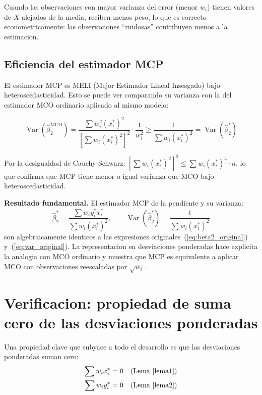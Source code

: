 \documentclass[12pt, letterpaper]{article}
\theoremstyle{remark}
\newcommand{\Var}{\operatorname{Var}}
\newcommand{\ystar}{y_i^*}
\newcommand{\xstar}{x_i^*}
\begin{document}
Cuando las observaciones con mayor varianza del error (menor $w_i$) tienen
valores de $X$ alejados de la media, reciben menos peso, lo que es correcto
econometricamente: las observaciones ``ruidosas'' contribuyen menos a la
estimacion.

\subsection{Eficiencia del estimador MCP}

El estimador MCP es MELI (Mejor Estimador Lineal Insesgado) bajo heteroscedasticidad.
Esto se puede ver comparando su varianza con la del estimador MCO ordinario
aplicado al mismo modelo:

\begin{equation}
  \Var(\hat\beta_2^{\text{MCO}})
    = \frac{\sum w_i^2 (\xstar)^2}{\left[\sum w_i(\xstar)^2\right]^2}
    \cdot \frac{1}{w_i^2}
  \geq \frac{1}{\sum w_i(\xstar)^2}
    = \Var(\hat\beta_2^*)
  \label{eq:eficiencia}
\end{equation}

Por la desigualdad de Cauchy-Schwarz:
$\left[\sum w_i(\xstar)^2\right]^2 \leq \sum w_i(\xstar)^4 \cdot n$,
lo que confirma que MCP tiene menor o igual varianza que MCO bajo heteroscedasticidad.

\begin{clave}
  \textbf{Resultado fundamental.} El estimador MCP de la pendiente y su varianza:
  \[
    \hat\beta_2^* = \frac{\sum w_i \ystar \xstar}{\sum w_i (\xstar)^2},
    \qquad
    \Var(\hat\beta_2^*) = \frac{1}{\sum w_i (\xstar)^2}
  \]
  son algebraicamente identicos a las expresiones originales~(\ref{eq:beta2_original})
  y~(\ref{eq:var_original}). La representacion en desviaciones ponderadas hace
  explicita la analogia con MCO ordinario y muestra que MCP es equivalente a
  aplicar MCO con observaciones reescaladas por $\sqrt{w_i}$.
\end{clave}

\appendix

\section{Verificacion: propiedad de suma cero de las desviaciones ponderadas}

Una propiedad clave que subyace a todo el desarrollo es que las desviaciones
ponderadas suman cero:
\begin{align}
  \sum w_i \xstar &= 0 \quad \text{(Lema~\ref{lema1})} \label{eq:prop1}\\
  \sum w_i \ystar &= 0 \quad \text{(Lema~\ref{lema2})} \label{eq:prop2}
\end{align}
\end{document}
